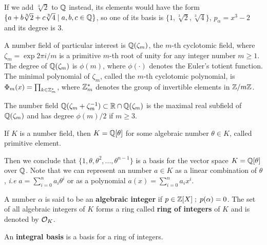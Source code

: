 \documentclass[a4paper,12pt]{article}
\begin{document}
\begin{example}
  If we add $\sqrt[3]{2}$ to $\mathbb{Q}$ instead, its elements would have the
  form $\{a + b\sqrt[3]{2} + c\sqrt[3]{4} \;|\; a,b,c \in \mathbb{Q}\}$, so one of
  its basis is $\{1 ,\sqrt[3]{2} ,\sqrt[3]{4}\}$, $p_\alpha = x^3 - 2$ and its degree
  is $3$.
\end{example}

\begin{example}\label{example:cyclotomic-number-field}
  A number field of particular interest is $\mathbb{Q}(\zeta_m)$, the $m$-th cyclotomic field,
  where $\zeta_m = \exp{2\pi i /m}$ is a primitive $m$-th root of unity for any
  integer number $m \geq 1$. The degree of $\mathbb{Q}(\zeta_m)$ is $\phi(m)$, where $\phi(\cdot)$
  denotes the Euler’s totient function. The minimal polynomial of $\zeta_m$, called
  the $m$-th cyclotomic polynomial, is $\Phi_m(x) = \prod_{k \in \mathbb{Z}_{m}^*}$, where $\mathbb{Z}^*_m$ denotes the group of invertible elements in $\mathbb{Z}/m\mathbb{Z}$.
\end{example}

\begin{example}
  \label{example:maximal-real-subfield}
  The number field $\mathbb{Q}(\zeta_m + \zeta_m^{-1}) \subset \mathbb{R} \cap \mathbb{Q}(\zeta_m)$ is the maximal real subfield of $\mathbb{Q}(\zeta_m)$ and has degree $\phi(m)/2$ if $m \geq 3$.
\end{example}

\begin{theorem}
   If $K$ is a number field, then $K = \mathbb{Q}[\theta]$ for some
  algebraic number $\theta \in K$, called primitive element.
\end{theorem}

Then we conclude that \(\{1, \theta, \theta^2, ... , \theta^{n-1}\}\) is a basis for the vector
space \(K = \mathbb{Q}[\theta]\) over \(\mathbb{Q}\). Note that we can represent an number \(a \in K\) as a linear combination of \(\theta\), \emph{i.e} \(a = \sum^n_{i=0}{a_i\theta^i}\) or as a polynomial \(a(x) = \sum^n_{i=0}{a_ix^i}\).

\begin{definition}
A number $\alpha$ is said to be an \textbf{algebraic integer} if $ p \in \mathbb{Z}[X] \;;\; p(\alpha) = 0$. The set of all algebraic integers of $K$ forms a ring called \textbf{ring of integers} of $K$ and is denoted by $\mathcal{O}_K$.
\end{definition}

\begin{definition}
An \textbf{integral basis} is a basis for a ring of integers. 
\end{definition}
\end{document}
